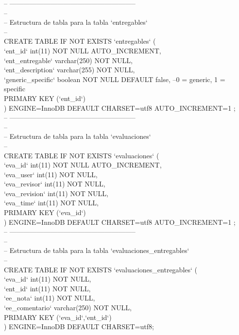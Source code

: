 -- --------------------------------------------------------\\

--\\
-- Estructura de tabla para la tabla `entregables`\\
--\\

CREATE TABLE IF NOT EXISTS `entregables` (\\
`ent\_id` int(11) NOT NULL AUTO\_INCREMENT,\\
`ent\_entregable` varchar(250) NOT NULL,\\
`ent\_description` varchar(255) NOT NULL,\\
`generic\_specific` boolean NOT NULL DEFAULT false, --0 = generic, 1 = specific\\
PRIMARY KEY (`ent\_id`)\\
) ENGINE=InnoDB  DEFAULT CHARSET=utf8 AUTO\_INCREMENT=1 ;\\

-- --------------------------------------------------------\\

--\\
-- Estructura de tabla para la tabla `evaluaciones`\\
--\\

CREATE TABLE IF NOT EXISTS `evaluaciones` (\\
`eva\_id` int(11) NOT NULL AUTO\_INCREMENT,\\
`eva\_user` int(11) NOT NULL,\\
`eva\_revisor` int(11) NOT NULL,\\
`eva\_revision` int(11) NOT NULL,\\
`eva\_time` int(11) NOT NULL,\\
PRIMARY KEY (`eva\_id`)\\
) ENGINE=InnoDB  DEFAULT CHARSET=utf8 AUTO\_INCREMENT=1 ;\\

-- --------------------------------------------------------\\

--\\
-- Estructura de tabla para la tabla `evaluaciones\_entregables`\\
--\\

CREATE TABLE IF NOT EXISTS `evaluaciones\_entregables` (\\
`eva\_id` int(11) NOT NULL,\\
`ent\_id` int(11) NOT NULL,\\
`ee\_nota` int(11) NOT NULL,\\
`ee\_comentario` varchar(250) NOT NULL,\\
PRIMARY KEY (`eva\_id`,`ent\_id`)\\
) ENGINE=InnoDB DEFAULT CHARSET=utf8;\\


